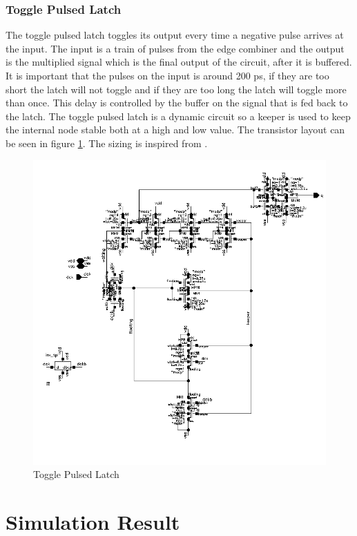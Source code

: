\documentclass[a4paper,12pt]{article} \usepackage{graphicx}
\begin{document}
\subsubsection{Toggle Pulsed Latch}
The toggle pulsed latch toggles its output every time a negative pulse arrives
at the input. The input is a train of pulses from the edge combiner and the
output is the multiplied signal which is the final output of the circuit, after
it is buffered. It is important that the pulses on the input is around 200 ps,
if they are too short the latch will not toggle and if they are too long the
latch will toggle more than once. This delay is controlled by the buffer on the
signal that is fed back to the latch. The toggle pulsed latch is a dynamic
circuit so a keeper is used to keep the internal node stable both at a high and
low value.
The transistor layout can be seen in figure \ref{fig:tpl}. The
sizing is inspired from \cite{dll_report}. 
\begin{figure}[p]
        \centering
        \includegraphics[width=\textwidth]{../Bilder/tpl_trans.png}
        \caption{Toggle Pulsed Latch}
        \label{fig:tpl}
\end{figure}

\section{Simulation Result}
\end{document}
